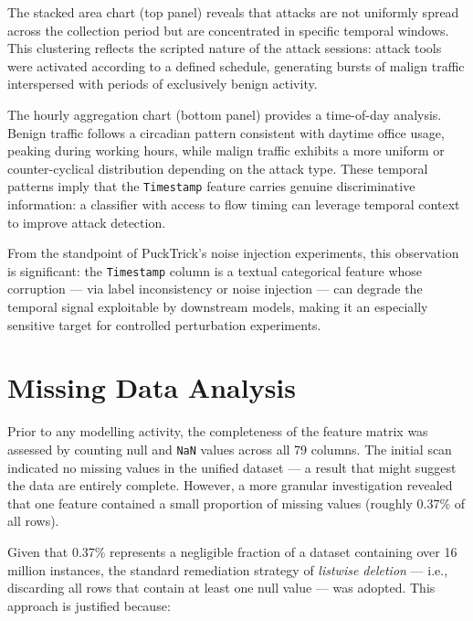 The stacked area chart (top panel) reveals that attacks are not uniformly
spread across the collection period but are concentrated in specific temporal
windows.  This clustering reflects the scripted nature of the attack sessions:
attack tools were activated according to a defined schedule, generating bursts
of malign traffic interspersed with periods of exclusively benign activity.

The hourly aggregation chart (bottom panel) provides a time-of-day analysis.
Benign traffic follows a circadian pattern consistent with daytime office
usage, peaking during working hours, while malign traffic exhibits a more
uniform or counter-cyclical distribution depending on the attack type.  These
temporal patterns imply that the \texttt{Timestamp} feature carries genuine
discriminative information: a classifier with access to flow timing can
leverage temporal context to improve attack detection.

From the standpoint of PuckTrick's noise injection experiments, this
observation is significant: the \texttt{Timestamp} column is a textual
categorical feature whose corruption — via label inconsistency or noise
injection — can degrade the temporal signal exploitable by downstream models,
making it an especially sensitive target for controlled perturbation experiments.

\section{Missing Data Analysis}
\label{sec:missing-data}

Prior to any modelling activity, the completeness of the feature matrix was
assessed by counting null and \texttt{NaN} values across all 79 columns.
The initial scan indicated no missing values in the unified dataset — a result
that might suggest the data are entirely complete.  However, a more granular
investigation revealed that one feature contained a small proportion of missing
values (roughly 0.37\% of all rows).

Given that 0.37\% represents a negligible fraction of a dataset containing
over 16 million instances, the standard remediation strategy of \emph{listwise
deletion} — i.e., discarding all rows that contain at least one null value — was
adopted.  This approach is justified because:

